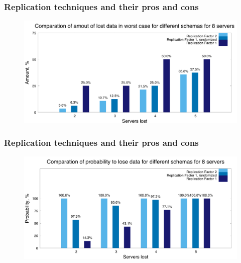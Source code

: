 \documentclass[aspectratio=43, unicode, notheorems, xcolor={dvipsnames}]{beamer}
\begin{document}
\begin{frame}
	\frametitle{Replication techniques and their pros and cons}
	\begin{figure}[h]
		\begin{center}
			\includegraphics[width=1.05\columnwidth]{experiment_8srv_cmp_al}
		\end{center}
	\end{figure}
\end{frame}
\begin{frame}
	\frametitle{Replication techniques and their pros and cons}
	\begin{figure}[h]
		\begin{center}
			\includegraphics[width=1.05\columnwidth]{experiment_8srv_cmp_cl}
		\end{center}
	\end{figure}

\end{frame}
\end{document}
